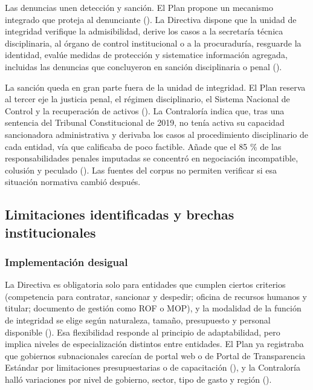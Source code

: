 \documentclass[Afour,sageh,times]{sagej}
\begin{document}
Las denuncias unen detección y sanción. El Plan propone un mecanismo integrado que proteja al denunciante (\citealp{pcm2018plan}). La Directiva dispone que la unidad de integridad verifique la admisibilidad, derive los casos a la secretaría técnica disciplinaria, al órgano de control institucional o a la procuraduría, resguarde la identidad, evalúe medidas de protección y sistematice información agregada, incluidas las denuncias que concluyeron en sanción disciplinaria o penal (\citealp{pcm2026directiva}).

La sanción queda en gran parte fuera de la unidad de integridad. El Plan reserva al tercer eje la justicia penal, el régimen disciplinario, el Sistema Nacional de Control y la recuperación de activos (\citealp{pcm2018plan}). La Contraloría indica que, tras una sentencia del Tribunal Constitucional de 2019, no tenía activa su capacidad sancionadora administrativa y derivaba los casos al procedimiento disciplinario de cada entidad, vía que calificaba de poco factible. Añade que el 85 \% de las responsabilidades penales imputadas se concentró en negociación incompatible, colusión y peculado (\citealp{contraloria2020corrupcion}). Las fuentes del corpus no permiten verificar si esa situación normativa cambió después.

\subsection{Limitaciones identificadas y brechas institucionales}
\label{subsec:limitaciones-brechas}

\subsubsection*{Implementación desigual}
La Directiva es obligatoria solo para entidades que cumplen ciertos criterios (competencia para contratar, sancionar y despedir; oficina de recursos humanos y titular; documento de gestión como ROF o MOP), y la modalidad de la función de integridad se elige según naturaleza, tamaño, presupuesto y personal disponible (\citealp{pcm2026directiva}). Esa flexibilidad responde al principio de adaptabilidad, pero implica niveles de especialización distintos entre entidades. El Plan ya registraba que gobiernos subnacionales carecían de portal web o de Portal de Transparencia Estándar por limitaciones presupuestarias o de capacitación (\citealp{pcm2018plan}), y la Contraloría halló variaciones por nivel de gobierno, sector, tipo de gasto y región (\citealp{contraloria2020corrupcion}).
\end{document}
